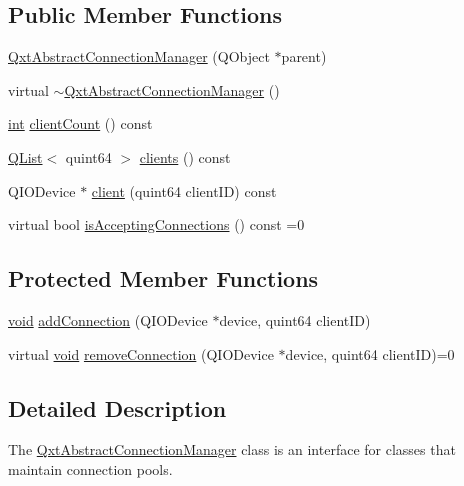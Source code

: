 \subsection*{Public Member Functions}
\begin{DoxyCompactItemize}
\item 
\hyperlink{class_qxt_abstract_connection_manager_a0ad19cdd2902dd3311591cb9e8b7bff3}{Qxt\-Abstract\-Connection\-Manager} (Q\-Object $\ast$parent)
\item 
virtual \hyperlink{class_qxt_abstract_connection_manager_a0241519f682ba387f411b18958a20bc3}{$\sim$\-Qxt\-Abstract\-Connection\-Manager} ()
\item 
\hyperlink{ioapi_8h_a787fa3cf048117ba7123753c1e74fcd6}{int} \hyperlink{class_qxt_abstract_connection_manager_a6acccf8371202b1cd74992dbda272bed}{client\-Count} () const 
\item 
\hyperlink{class_q_list}{Q\-List}$<$ quint64 $>$ \hyperlink{class_qxt_abstract_connection_manager_a3f56af8280c20210a4694d79a206d2bb}{clients} () const 
\item 
Q\-I\-O\-Device $\ast$ \hyperlink{class_qxt_abstract_connection_manager_ac2c475e0e4dcf2431f20eaabbb44fd9c}{client} (quint64 client\-I\-D) const 
\item 
virtual bool \hyperlink{class_qxt_abstract_connection_manager_ac16a3f73a5f26ce75ef7967dfc9c6e25}{is\-Accepting\-Connections} () const =0
\end{DoxyCompactItemize}
\subsection*{Protected Member Functions}
\begin{DoxyCompactItemize}
\item 
\hyperlink{group___u_a_v_objects_plugin_ga444cf2ff3f0ecbe028adce838d373f5c}{void} \hyperlink{class_qxt_abstract_connection_manager_ae384843778af5ec30cba82870bfef5ee}{add\-Connection} (Q\-I\-O\-Device $\ast$device, quint64 client\-I\-D)
\item 
virtual \hyperlink{group___u_a_v_objects_plugin_ga444cf2ff3f0ecbe028adce838d373f5c}{void} \hyperlink{class_qxt_abstract_connection_manager_a796c43f7c8996d21111a9e35141e0078}{remove\-Connection} (Q\-I\-O\-Device $\ast$device, quint64 client\-I\-D)=0
\end{DoxyCompactItemize}


\subsection{Detailed Description}
The \hyperlink{class_qxt_abstract_connection_manager}{Qxt\-Abstract\-Connection\-Manager} class is an interface for classes that maintain connection pools. 

